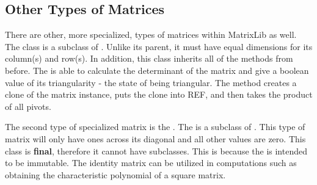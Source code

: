 \subsection*{Other Types of Matrices}
There are other, more specialized, types of matrices within MatrixLib as well.
The  class is a subclass of .
Unlike its parent, it must have equal dimensions for its column(s) and row(s).
In addition, this class inherits all of the methods from before.
The  is able to calculate the determinant of the matrix and give a boolean value of its triangularity - the state of being triangular.
The  method creates a clone of the matrix instance, puts the clone into REF, and then takes the product of all pivots.

The second type of specialized matrix is the .
The  is a subclass of .
This type of matrix will only have ones across its diagonal and all other values are zero.
This class is \textbf{final}, therefore it cannot have subclasses.
This is because the  is intended to be immutable.
The identity matrix can be utilized in computations such as obtaining the characteristic polynomial of a square matrix.